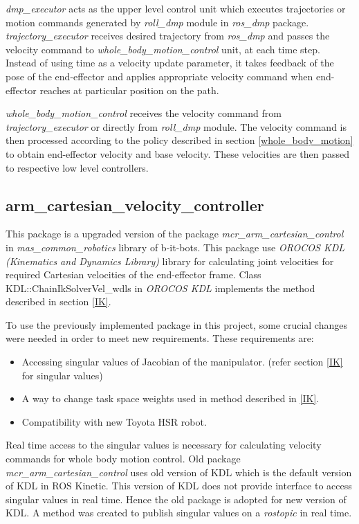 \textit{dmp\_executor} acts as the upper level control unit which executes trajectories or motion commands generated by \textit{roll\_dmp} module in \textit{ros\_dmp} package. \textit{trajectory\_executor} receives desired trajectory from \textit{ros\_dmp} and passes the velocity command to \textit{whole\_body\_motion\_control} unit, at each time step. Instead of using time as a velocity update parameter, it takes feedback of the pose of the end-effector and applies appropriate velocity command when end-effector reaches at particular position on the path.  


\textit{whole\_body\_motion\_control} receives the velocity command from \textit{trajectory\_executor} or directly from \textit{roll\_dmp} module. The velocity command is then processed according to the policy described in section \ref{whole_body_motion} to obtain end-effector velocity and base velocity. These velocities are then passed to respective low level controllers.

\subsection{arm\_cartesian\_velocity\_controller}

This package is a upgraded version of the package \textit{mcr\_arm\_cartesian\_control} in \textit{mas\_common\_robotics} library of b-it-bots. This package use \textit{OROCOS KDL (Kinematics and Dynamics Library)} library for calculating joint velocities for required Cartesian velocities of the end-effector frame. Class KDL::ChainIkSolverVel\_wdls in \textit{OROCOS KDL} implements the method described in section \ref{IK}. 

To use the previously implemented package in this project, some crucial changes were needed in order to meet new requirements. These requirements are:

\begin{itemize}
	\item Accessing singular values of Jacobian of the manipulator. (refer section \ref{IK} for singular values) 
	\item A way to change task space weights used in method described in \ref{IK}.
	\item Compatibility with new Toyota HSR robot. 
\end{itemize} 

Real time access to the singular values is necessary for calculating velocity commands for whole body motion control. Old package \textit{mcr\_arm\_cartesian\_control} uses old version of KDL which is the default version of KDL in ROS Kinetic. This version of KDL does not provide interface to access singular values in real time. Hence the old package is adopted for new version of KDL. A method was created to publish singular values on a \textit{rostopic} in real time. 

